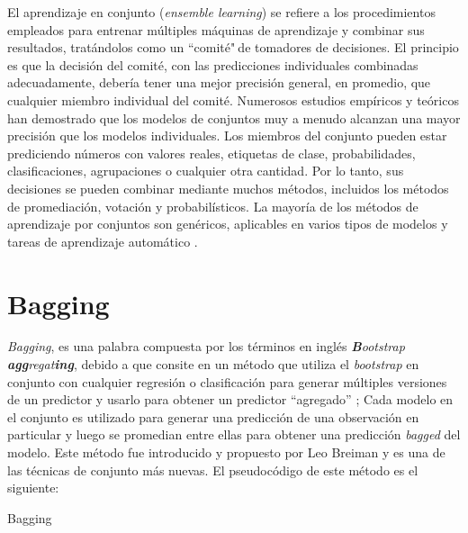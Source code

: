 El aprendizaje en conjunto (\textit{ensemble learning}) se refiere a los procedimientos empleados para entrenar múltiples máquinas de aprendizaje y combinar sus resultados, tratándolos como un ``comité"$~$de tomadores de decisiones. 
El principio es que la decisión del comité, con las predicciones individuales combinadas adecuadamente, debería tener una mejor precisión general, en promedio, que cualquier miembro individual del comité. 
Numerosos estudios empíricos y teóricos han demostrado que los modelos de conjuntos muy a menudo alcanzan una mayor precisión que los modelos individuales.
Los miembros del conjunto pueden estar prediciendo números con valores reales, etiquetas de clase, probabilidades, clasificaciones, agrupaciones o cualquier otra cantidad. Por lo tanto, 
sus decisiones se pueden combinar mediante muchos métodos, incluidos los métodos de promediación, votación y probabilísticos. La mayoría de los métodos de aprendizaje por conjuntos son genéricos, 
aplicables en varios tipos de modelos y tareas de aprendizaje automático \cite{6}.


\section{Bagging}
\textit{Bagging}, es una palabra compuesta por los términos en inglés \textit{\textbf{B}ootstrap \textbf{agg}regat\textbf{ing}}, 
debido a que consite en un método que utiliza el \textit{bootstrap} en conjunto con cualquier regresión o clasificación
para generar múltiples versiones de un predictor y usarlo para obtener un predictor ``agregado'' \cite{22}; Cada modelo en el conjunto es utilizado para generar una predicción de una observación en particular 
y luego se promedian entre ellas para obtener una predicción \textit{bagged} del modelo.
Este método fue introducido y propuesto por Leo Breiman y es una de las técnicas
de conjunto más nuevas. El pseudocódigo de este método es el siguiente:

\begin{algorithm}[H]
    \caption{Bagging}

    \begin{algorithmic}[1]
        \ENDFOR

    \end{algorithmic}
\end{algorithm}

